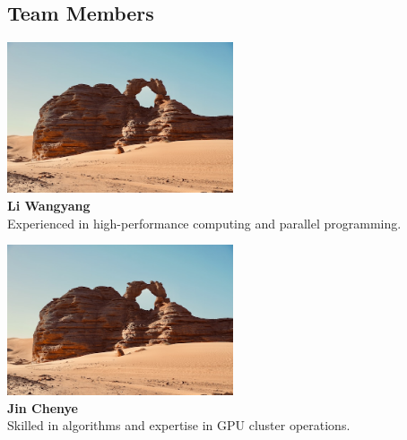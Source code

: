 \documentclass[a4paper,12pt]{article}
\begin{document}
\subsection{Team Members}
\begin{table}[H]
\centering
\begin{center}
    \begin{minipage}{0.45\textwidth}
        \centering
        \includegraphics[width=0.5\textwidth]{Li_Wangyang.png}\\[0.3cm]
        \textbf{Li Wangyang}\\[0.3cm]
        \small{Experienced in high-performance computing and parallel programming.}
    \end{minipage}
\begin{minipage}{0.45\textwidth}
    \centering
    \includegraphics[width=0.5\textwidth]{Jin_Chenye.png}\\[0.3cm]
    \textbf{Jin Chenye}\\[0.3cm]
    \small{Skilled in algorithms and expertise in GPU cluster operations.}
\end{minipage}

\vspace{1cm}


\end{center}
\end{table}
\end{document}

